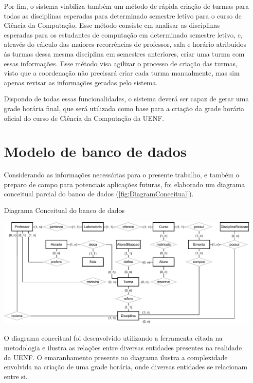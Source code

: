 Por fim, o sistema viabiliza também um método de rápida criação de turmas para todas as disciplinas esperadas para determinado semestre letivo para o curso de Ciência da Computação. Esse método consiste em analisar as disciplinas esperadas para os estudantes de computação em determinado semestre letivo, e, através do cálculo das maiores recorrências de professor, sala e horário atribuídos às turmas dessa mesma disciplina em semestres anteriores, criar uma turma com essas informações. Esse método visa agilizar o processo de criação das turmas, visto que a coordenação não precisará criar cada turma manualmente, mas sim apenas revisar as informações geradas pelo sistema.

Dispondo de todas essas funcionalidades, o sistema deverá ser capaz de gerar uma grade horária final, que será utilizada como base para a criação da grade horária oficial do curso de Ciência da Computação da UENF.

\section{Modelo de banco de dados} \label{sec:ModelagemBD} %

Considerando as informações necessárias para o presente trabalho, e também o preparo de campo para potenciais aplicações futuras, foi elaborado um diagrama conceitual parcial do banco de dados (\autoref{fig:DiagramConceitual}).

\begin{MyCenteredFigure} \caption{Diagrama Conceitual do banco de dados} \label{fig:DiagramConceitual}
  \includegraphics[width=\textwidth]{files/img/2.02!4-modelagem/Diagrama ER-Conc. Card}
\end{MyCenteredFigure}

O diagrama conceitual foi desenvolvido utilizando a ferramenta  citada na metodologia e ilustra as relações entre diversas entidades presentes na realidade da UENF. O emaranhamento presente no diagrama ilustra a complexidade envolvida na criação de uma grade horária, onde diversas entidades se relacionam entre si.

